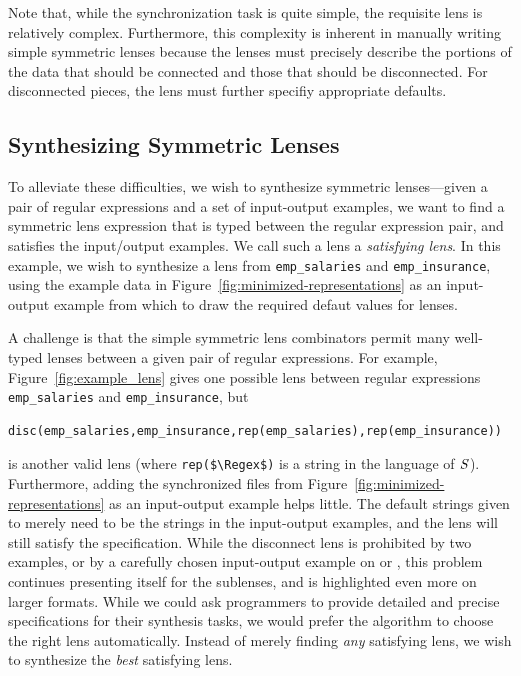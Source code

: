 \documentclass[acmsmall,screen,anonymous]{acmart}
\begin{document}
Note that, while the synchronization task is quite simple, the
requisite lens is relatively complex. Furthermore, this complexity is
inherent in manually writing simple symmetric lenses because the
lenses must precisely describe the portions of the data that should be
connected and those that should be disconnected.  For disconnected
pieces, the lens must further specifiy appropriate defaults.



\subsection{Synthesizing Symmetric Lenses}

To alleviate these difficulties, we wish to synthesize symmetric lenses---given
a pair of regular expressions and a set of input-output examples, we want to
find a symmetric lens expression that is typed between the regular expression
pair, and satisfies the input/output examples. We call such a lens
a \emph{satisfying lens}.
In this example, we wish to
synthesize a lens from \lstinline{emp_salaries} and \lstinline{emp_insurance},
using the example data in Figure~\ref{fig:minimized-representations} as an
input-output example from which to draw the required defaut values for 
\Disconnect lenses.  

A challenge is that the simple symmetric lens combinators permit many
well-typed lenses
between a given pair of regular expressions. For example, 
Figure~\ref{fig:example_lens} gives one possible lens between regular
expressions  \lstinline{emp_salaries} and \lstinline{emp_insurance},
but 
%
\begin{lstlisting}
disc(emp_salaries,emp_insurance,rep(emp_salaries),rep(emp_insurance))
\end{lstlisting}
%
is another valid lens (where \lstinline{rep($\Regex$)} is a string in the
language of $\mathit{S}$). Furthermore, adding the synchronized files from
Figure~\ref{fig:minimized-representations} as an input-output example helps
little. The default strings given to \Disconnect merely need to be the strings
in the input-output examples, and the lens will still satisfy the specification.
While the disconnect lens is prohibited by two examples, or by a carefully
chosen input-output example on \PutR or \PutL, this problem continues presenting
itself for the sublenses, and is highlighted even more on larger
formats. 
While
we could ask programmers to provide detailed and precise specifications for their
synthesis tasks, we would prefer the algorithm to choose the right lens
automatically. Instead of merely finding \emph{any} satisfying lens, we wish to
synthesize the \emph{best} satisfying lens.  
\end{document}
